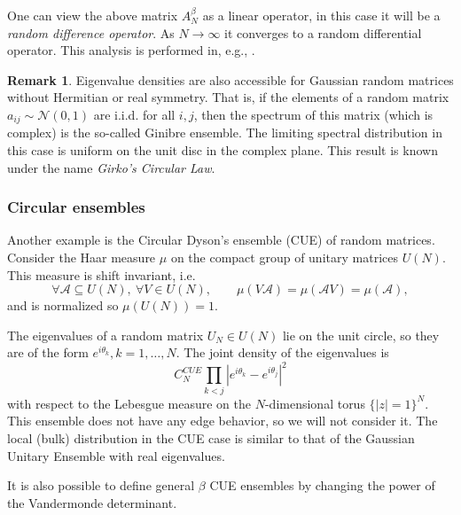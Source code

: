 \documentclass[letterpaper,11pt,oneside,reqno]{amsart}
\numberwithin{equation}{section}
\theoremstyle{definition}
\newtheorem{remark}[proposition]{Remark}
\begin{document}
One can view the above matrix $A_N^\beta$ as a linear operator, in this case it will be a 
\emph{random difference operator}.
As $N\to \infty$ it converges to a random differential operator. This analysis is performed in,
e.g., \cite{RamirezRiderVirag2006RandomAiry}.

\begin{remark}
  Eigenvalue densities are also accessible for Gaussian random matrices without Hermitian or real symmetry. 
  That is, if the elements of a random matrix
  $a_{ij}\sim \mathcal{N}(0,1)$ are i.i.d. for all $i,j$, then the spectrum
  of this matrix (which is complex)
  is the so-called Ginibre ensemble. The limiting spectral distribution
  in this case is uniform on the unit disc in the complex plane. This result
  is known under the name \emph{Girko's Circular Law}.
\end{remark}


\subsubsection{Circular ensembles} %
\label{ssub:circular_ensembles}

Another example is the Circular Dyson's ensemble (CUE) of random matrices.
Consider the Haar measure $\mu$ on the compact group of unitary matrices $U(N)$. This measure is shift invariant, i.e.
\begin{equation*}
  \forall \mathcal{A}\subseteq U(N),\ \forall V\in U(N),\qquad \mu(V\mathcal{A})=\mu(\mathcal{A}V)=\mu(\mathcal{A}),
\end{equation*}
and is normalized so $\mu(U(N))=1$.

The eigenvalues of a random matrix $U_N\in U(N)$ lie on the unit circle, so they are of the form $e^{i\theta_k}, k=1,\ldots, N$. The joint density of the eigenvalues is 
\begin{equation*}
  C_N^{CUE} \prod_{k<j} |e^{i\theta_k}-e^{i\theta_j}|^2
\end{equation*}
with respect to the Lebesgue measure on the $N$-dimensional torus $\{|z|=1\}^N$. 
This ensemble does not have any edge behavior, so we will not consider it. 
The local (bulk) distribution in the CUE case is similar to that of the Gaussian Unitary Ensemble
with real eigenvalues.

It is also possible to define general $\beta$ CUE ensembles by changing the power of the Vandermonde determinant.
\end{document}
